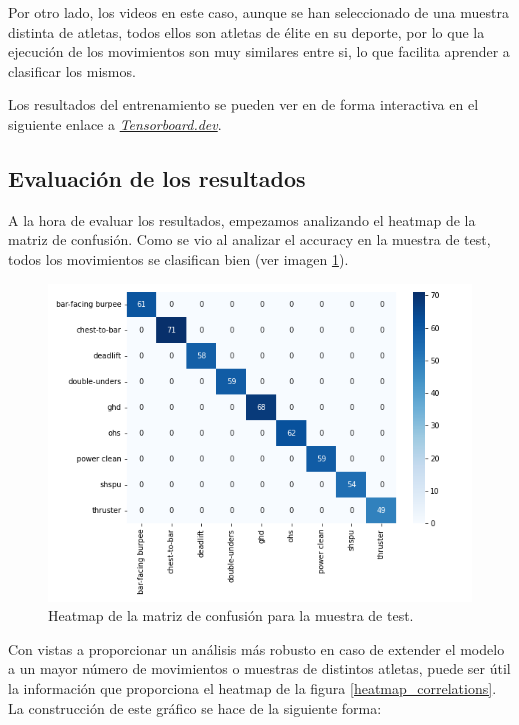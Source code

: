 Por otro lado, los videos en este caso, aunque se han seleccionado de una muestra distinta de atletas, todos ellos son atletas de élite en su deporte, por lo que la ejecución de los movimientos son muy similares entre si, lo que facilita aprender a clasificar los mismos.

Los resultados del entrenamiento se pueden ver en de forma interactiva en el siguiente enlace a \href{https://tensorboard.dev/experiment/UXyupsnMQ2S74vdul3vdbw/#scalars}{\textit{Tensorboard.dev}}.


\subsection{Evaluación de los resultados}

A la hora de evaluar los resultados, empezamos analizando el heatmap de la matriz de confusión. Como se vio al analizar el accuracy en la muestra de test, todos los movimientos se clasifican bien (ver imagen \ref{app_3}).

\begin{figure}[H]
    \centering
		\includegraphics[width=\textwidth]{figs/heatmap_confusion.png}
\caption{Heatmap de la matriz de confusión para la muestra de test.}\label{app_3}
\end{figure}

Con vistas a proporcionar un análisis más robusto en caso de extender el modelo a un mayor número de movimientos o muestras de distintos atletas, puede ser útil la información que proporciona el heatmap de la figura \ref{heatmap_correlations}. La construcción de este gráfico se hace de la siguiente forma:

